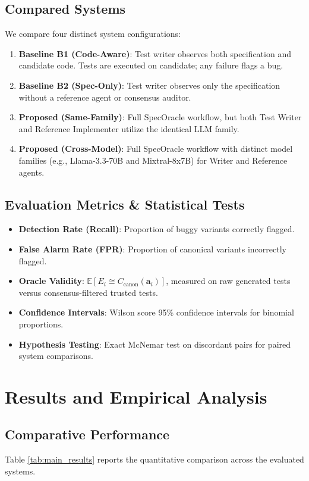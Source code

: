 \documentclass[conference]{IEEEtran}
\begin{document}
\subsection{Compared Systems}
We compare four distinct system configurations:
\begin{enumerate}
    \item \textbf{Baseline B1 (Code-Aware)}: Test writer observes both specification and candidate code. Tests are executed on candidate; any failure flags a bug.
    \item \textbf{Baseline B2 (Spec-Only)}: Test writer observes only the specification without a reference agent or consensus auditor.
    \item \textbf{Proposed (Same-Family)}: Full SpecOracle workflow, but both Test Writer and Reference Implementer utilize the identical LLM family.
    \item \textbf{Proposed (Cross-Model)}: Full SpecOracle workflow with distinct model families (e.g., Llama-3.3-70B and Mixtral-8x7B) for Writer and Reference agents.
\end{enumerate}

\subsection{Evaluation Metrics \& Statistical Tests}
\begin{itemize}
    \item \textbf{Detection Rate (Recall)}: Proportion of buggy variants correctly flagged.
    \item \textbf{False Alarm Rate (FPR)}: Proportion of canonical variants incorrectly flagged.
    \item \textbf{Oracle Validity}: $\mathbb{E}[E_i \cong C_{\text{canon}}(\mathbf{a}_i)]$, measured on raw generated tests versus consensus-filtered trusted tests.
    \item \textbf{Confidence Intervals}: Wilson score 95\% confidence intervals for binomial proportions.
    \item \textbf{Hypothesis Testing}: Exact McNemar test on discordant pairs for paired system comparisons.
\end{itemize}

\section{Results and Empirical Analysis}

\subsection{Comparative Performance}
Table \ref{tab:main_results} reports the quantitative comparison across the evaluated systems.
\end{document}
